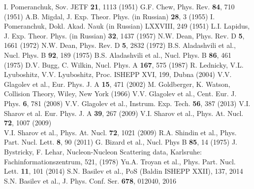 \documentclass[twocolumn,epjc3]{svjour3}
\begin{document}
\begin{thebibliography}{99}
  I. Pomeranchuk, Sov. JETF \textbf{21}, 1113 (1951)
  G.F. Chew, Phys. Rev. \textbf{84}, 710 (1951)
  A.B. Migdal, J. Exp. Theor. Phys. (in Russian) \textbf{28}, 3 (1955)
  I. Pomeranchuk, Dokl. Akad. Nauk (in Russian) LXXVIII, 249 (1951)
  L.I. Lapidus, J. Exp. Theor. Phys. (in Russian) \textbf{32}, 1437 (1957)
  N.W. Dean, Phys. Rev. D \textbf{5}, 1661 (1972)
  N.W. Dean, Phys. Rev. D \textbf{5}, 2832 (1972)
  B.S. Aladashvili et al., Nucl. Phys. B \textbf{92}, 189 (1975)
  B.S. Aladashvili et al., Nucl. Phys. B \textbf{86}, 461 (1975)
  D.V. Bugg, C. Wilkin, Nucl. Phys. A \textbf{167}, 575 (1987)
  R. Lednicky, V.L. Lyuboshitz, V.V. Lyuboshitz, Proc. ISHEPP XVI, 199,
  Dubna (2004)
  V.V. Glagolev et al., Eur. Phys. J. A \textbf{15}, 471 (2002)
  M. Goldberger, K. Watson, Collision Theory, Wiley, New York (1966)
  V.V. Glagolev et al., Cent. Eur. J. Phys. \textbf{6}, 781 (2008)
  V.V. Glagolev et al., Instrum. Exp. Tech. \textbf{56}, 387 (2013)
  V.I. Sharov et al. Eur. Phys. J. A \textbf{39}, 267 (2009)
  V.I. Sharov et al., Phys. At. Nucl. \textbf{72}, 1007 (2009) \\ %
  V.I. Sharov et al., Phys. At. Nucl. \textbf{72}, 1021 (2009)
  R.A. Shindin et al., Phys. Part. Nucl. Lett. \textbf{8}, 90 (2011)
  G. Bizard et al., Nucl. Phys B \textbf{85}, 14 (1975)
  J. Bystricky, F. Lehar, Nucleon-Nucleon Scattering data, Karlsruhe:
  Fachinformationszentrum, 521, (1978)
  Yu.A. Troyan et al., Phys. Part. Nucl. Lett. \textbf{11}, 101 (2014)
  S.N. Basilev et al., PoS (Baldin ISHEPP XXII), 137, 2014
  S.N. Basilev et al., J. Phys. Conf. Ser. \textbf{678}, 012040, 2016
\end{thebibliography}
\end{document}

